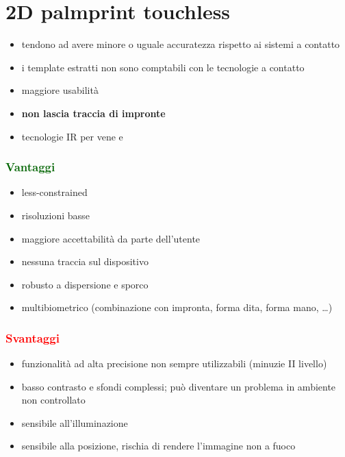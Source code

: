 \documentclass{report}
\begin{document}
\section{2D palmprint touchless}

\begin{itemize}
    \item tendono ad avere minore o uguale accuratezza rispetto ai sistemi a contatto 
    \item i template estratti non sono comptabili con le tecnologie a contatto 
    \item maggiore usabilità 
    \item \textbf{non lascia traccia di impronte}
    \item tecnologie IR per vene e 
\end{itemize}

\subsubsection{\textcolor{darkgreen}{Vantaggi}}

\begin{itemize}
    \item less-constrained
    \item risoluzioni basse 
    \item maggiore accettabilità da parte dell'utente
    \item nessuna traccia sul dispositivo 
    \item robusto a dispersione e sporco 
    \item multibiometrico (combinazione con impronta, forma dita, forma mano, \dots)
\end{itemize}

\subsubsection{\textcolor{red}{Svantaggi}}

\begin{itemize}
    \item funzionalità ad alta precisione non sempre utilizzabili (minuzie II livello)
    \item basso contrasto e sfondi complessi; può diventare un problema in ambiente non controllato
    \item sensibile all'illuminazione 
    \item sensibile alla posizione, rischia di rendere l'immagine non a fuoco 
\end{itemize}
\end{document}
